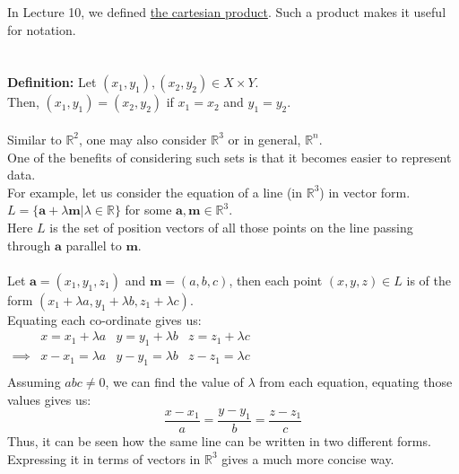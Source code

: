In Lecture 10, we defined \hyperref[sec:cartproduct]{the cartesian product}. Such a product makes it useful for notation.\\
\\~\\
\textbf{Definition: }Let $(x_1, y_1), (x_2, y_2) \in X \times Y$.\\
\phantom{Definition: I} Then, $(x_1, y_1) = (x_2, y_2)$ if $x_1 = x_2$ and $y_1 = y_2$.\\~\\
Similar to $\mathbb{R}^2$, one may also consider $\mathbb{R}^3$ or in general, $\mathbb{R}^n$.\\
One of the benefits of considering such sets is that it becomes easier to represent data. \\
For example, let us consider the equation of a line (in $\mathbb{R}^3$) in vector form.\\
$L = \{\textbf{a} + \lambda\textbf{m}|\lambda \in \mathbb{R}\}$ for some $\textbf{a}, \textbf{m} \in \mathbb{R}^3$.\\
Here $L$ is the set of position vectors of all those points on the line passing through $\textbf{a}$ parallel to $\textbf{m}$.\\~\\
Let $\textbf{a} = (x_1, y_1, z_1)$ and $\textbf{m} = (a, b, c)$, then each point $(x, y, z) \in L$ is of the form $(x_1 + \lambda a, y_1 + \lambda b, z_1 + \lambda c)$.\\
Equating each co-ordinate gives us:\\
\(\begin{array}{rccc}
    & x = x_1 + \lambda a & y = y_1 + \lambda b & z = z_1 + \lambda c \\
    \implies & x - x_1 = \lambda a & y - y_1 = \lambda b & z - z_1 = \lambda c \\
\end{array}\)\\
Assuming $abc\neq0$, we can find the value of $\lambda$ from each equation, equating those values gives us:
$$\dfrac{x-x_1}{a}=\dfrac{y-y_1}{b}=\dfrac{z-z_1}{c}$$
Thus, it can be seen how the same line can be written in two different forms. Expressing it in terms of vectors in $\mathbb{R}^3$ gives a much more concise way.\\
